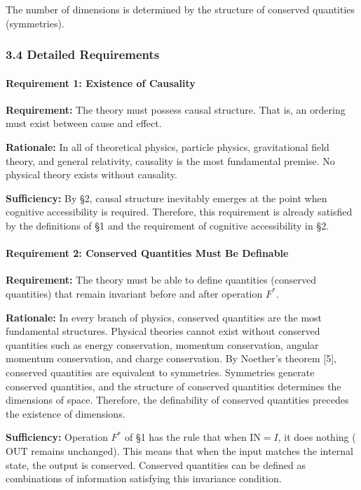 \documentclass[a4paper,11pt]{article}
\begin{document}
The number of dimensions is determined by the structure of conserved
quantities (symmetries).

\subsubsection{3.4 Detailed Requirements}\label{detailed-requirements}

\paragraph{Requirement 1: Existence of
Causality}\label{requirement-1-existence-of-causality}

\textbf{Requirement:} The theory must possess causal structure. That is,
an ordering must exist between cause and effect.

\textbf{Rationale:} In all of theoretical physics, particle physics,
gravitational field theory, and general relativity, causality is the
most fundamental premise. No physical theory exists without causality.

\textbf{Sufficiency:} By §2, causal structure inevitably emerges at the
point when cognitive accessibility is required. Therefore, this
requirement is already satisfied by the definitions of §1 and the
requirement of cognitive accessibility in §2.

\paragraph{Requirement 2: Conserved Quantities Must Be
Definable}\label{requirement-2-conserved-quantities-must-be-definable}

\textbf{Requirement:} The theory must be able to define quantities
(conserved quantities) that remain invariant before and after operation
\(F^*\).

\textbf{Rationale:} In every branch of physics, conserved quantities are
the most fundamental structures. Physical theories cannot exist without
conserved quantities such as energy conservation, momentum conservation,
angular momentum conservation, and charge conservation. By Noether's
theorem {[}5{]}, conserved quantities are equivalent to symmetries.
Symmetries generate conserved quantities, and the structure of conserved
quantities determines the dimensions of space. Therefore, the
definability of conserved quantities precedes the existence of
dimensions.

\textbf{Sufficiency:} Operation \(F^*\) of §1 has the rule that when
\(\mathrm{IN} = I\), it does nothing (\(\mathrm{OUT}\) remains
unchanged). This means that when the input matches the internal state,
the output is conserved. Conserved quantities can be defined as
combinations of information satisfying this invariance condition.
\end{document}
